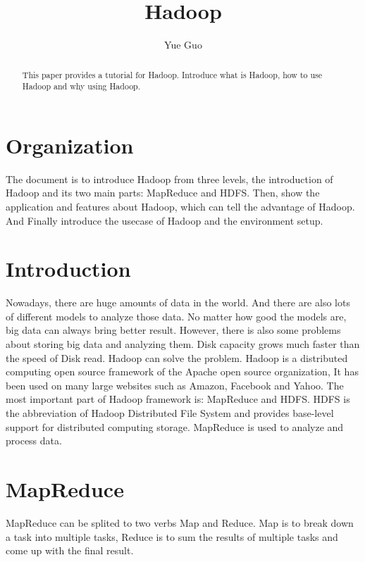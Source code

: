 
\title{Hadoop}



\author{Yue Guo}

\begin{abstract}
This paper provides a tutorial for Hadoop. Introduce what is Hadoop, how to use Hadoop and why using Hadoop.
\end{abstract}



\maketitle

\section{Organization}
The document is to introduce Hadoop from three levels, the introduction of Hadoop and its  two main parts: MapReduce and HDFS. Then, show the application and features about Hadoop, which can tell the advantage of Hadoop. And Finally introduce the usecase of Hadoop and the environment setup.

\section{Introduction}
Nowadays, there are huge amounts of data in the world. And there are also lots of different models to analyze those data. No matter how good the models are, big data can always bring better result. However, there is also some problems about storing big data and analyzing them. Disk capacity grows much faster than the speed of Disk read. Hadoop can solve the problem. Hadoop is a distributed computing open source framework of the Apache open source organization, It has been used on many large websites such as Amazon, Facebook and Yahoo. The most important part of Hadoop framework is: MapReduce and HDFS. HDFS is the abbreviation of Hadoop Distributed File System and provides base-level support for distributed computing storage. MapReduce is used to analyze and process data.

\section{MapReduce}
MapReduce can be splited to two verbs Map and Reduce. Map is to break down a task into multiple tasks, Reduce is to sum the results of multiple tasks and come up with the final result. 

